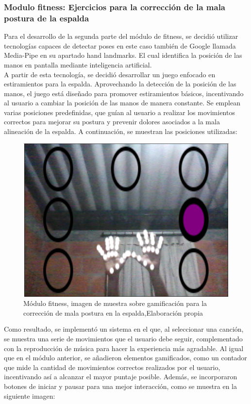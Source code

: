 \subsubsection{Modulo fitness: Ejercicios para la corrección de la mala postura de la espalda}
Para el desarrollo de la segunda parte del módulo de fitness, se decidió utilizar tecnologías capaces de detectar poses en este caso también de Google llamada Media-Pipe en su apartado hand landmarks. El cual identifica la posición de las manos en pantalla mediante inteligencia artificial.
\\
A partir de esta tecnología, se decidió desarrollar un juego enfocado en estiramientos para la espalda. Aprovechando la detección de la posición de las manos, el juego está diseñado para promover estiramientos básicos, incentivando al usuario a cambiar la posición de las manos de manera constante. Se emplean varias posiciones predefinidas, que guían al usuario a realizar los movimientos correctos para mejorar su postura y prevenir dolores asociados a la mala alineación de la espalda. A continuación, se muestran las posiciones utilizadas:
\begin{figure}[H]
  \centering
  \includegraphics[width=0.6\linewidth]{Imagenes/Fitness3.png}
  \caption{Módulo fitness, imagen de muestra sobre gamificación para la corrección de mala postura en la espalda,Elaboración propia}
  \label{fig:imagen4fitness}
\end{figure}


Como resultado, se implementó un sistema en el que, al seleccionar una canción, se muestra una serie de movimientos que el usuario debe seguir, complementado con la reproducción de música para hacer la experiencia más agradable. Al igual que en el módulo anterior, se añadieron elementos gamificados, como un contador que mide la cantidad de movimientos correctos realizados por el usuario, incentivando así a alcanzar el mayor puntaje posible. Además, se incorporaron botones de iniciar y pausar para una mejor interacción, como se muestra en la siguiente imagen:


